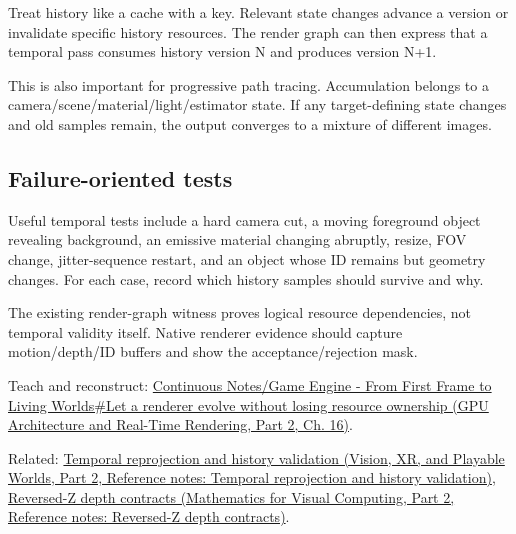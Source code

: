 \hypertarget{appendix-2e7e9fd28a2c-versioned-history}{}

Treat history like a cache with a key. Relevant state changes advance a version or invalidate specific history resources. The render graph can then express that a temporal pass consumes history version N and produces version N+1.

This is also important for progressive path tracing. Accumulation belongs to a camera/scene/material/light/estimator state. If any target-defining state changes and old samples remain, the output converges to a mixture of different images.

\subsection{Failure-oriented tests}\label{appendix-2e7e9fd28a2c-failure-oriented-tests}

\hypertarget{appendix-2e7e9fd28a2c-failure-oriented-tests}{}

Useful temporal tests include a hard camera cut, a moving foreground object revealing background, an emissive material changing abruptly, resize, FOV change, jitter-sequence restart, and an object whose ID remains but geometry changes. For each case, record which history samples should survive and why.

The existing render-graph witness proves logical resource dependencies, not temporal validity itself. Native renderer evidence should capture motion/depth/ID buffers and show the acceptance/rejection mask.

Teach and reconstruct: \href{../06-GPU-Architecture-and-Real-Time-Rendering-P02/main.pdf\#06-engine-ii-ch025-let-a-renderer-evolve-without-losing-resource-ownership}{Continuous Notes/Game Engine - From First Frame to Living Worlds\#Let a renderer evolve without losing resource ownership (GPU Architecture and Real-Time Rendering, Part 2, Ch. 16)}.

Related: \href{../07-Vision-XR-and-Playable-Worlds-P02/main.pdf\#appendix-0727340a4428}{Temporal reprojection and history validation (Vision, XR, and Playable Worlds, Part 2, Reference notes: Temporal reprojection and history validation)}, \href{../02-Mathematics-for-Visual-Computing-P02/main.pdf\#appendix-275ec8847057}{Reversed-Z depth contracts (Mathematics for Visual Computing, Part 2, Reference notes: Reversed-Z depth contracts)}.
